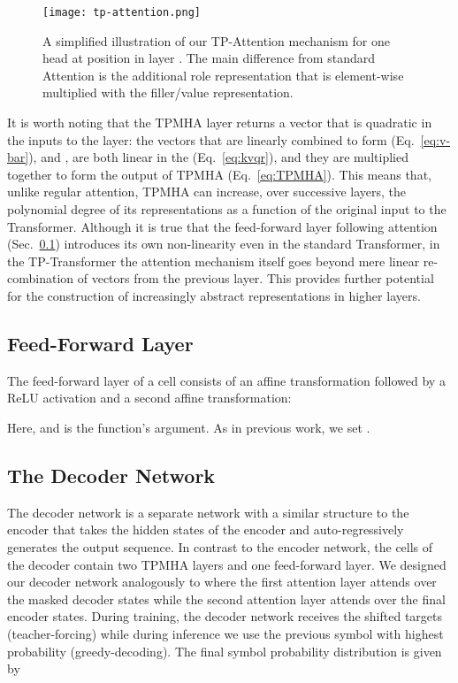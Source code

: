 \documentclass[11pt,a4paper]{article}
\begin{document}
\begin{figure}[ht]
    \begin{center}
    \texttt{[image: tp-attention.png]}
    \end{center}
    \caption{A simplified illustration of our TP-Attention mechanism for one head at position  in layer . The main difference from standard Attention is the additional role representation that is element-wise multiplied with the filler/value representation.}
    \label{fig:TP-Attention}
\end{figure}

It is worth noting that the  TPMHA layer returns a vector that is quadratic in the inputs  to the layer: the vectors  that are linearly combined to form  (Eq.~\ref{eq:v-bar}), and , are both linear in the  (Eq.~\ref{eq:kvqr}), and they are multiplied together to form the output of TPMHA (Eq.~\ref{eq:TPMHA}). 
This means that, unlike regular attention, TPMHA can increase, over successive layers, the polynomial degree of its representations as a function of the original input to the Transformer.
Although it is true that the feed-forward layer following attention (Sec.~\ref{sec:FF}) introduces its own non-linearity even in the standard Transformer, in the TP-Transformer the attention mechanism itself goes beyond mere linear re-combination of vectors from the previous layer. This provides further potential for the construction of increasingly abstract representations in higher layers. 

\subsection{Feed-Forward Layer} \label{sec:FF}
The feed-forward layer of a cell consists of an affine transformation followed by a ReLU activation and a second affine transformation:

Here,  and  is the function's argument.
As in previous work, we set . 

\subsection{The Decoder Network}
The decoder network is a separate network with a similar structure to the encoder that takes the hidden states of the encoder and auto-regressively generates the output sequence. 
In contrast to the encoder network, the cells of the decoder contain two TPMHA layers and one feed-forward layer.
We designed our decoder network analogously to \cite{vaswani2017attention} where the first attention layer attends over the masked decoder states while the second attention layer attends over the final encoder states.
During training, the decoder network receives the shifted targets (teacher-forcing) while during inference we use the previous symbol with highest probability (greedy-decoding). 
The final symbol probability distribution is given by
\end{document}
